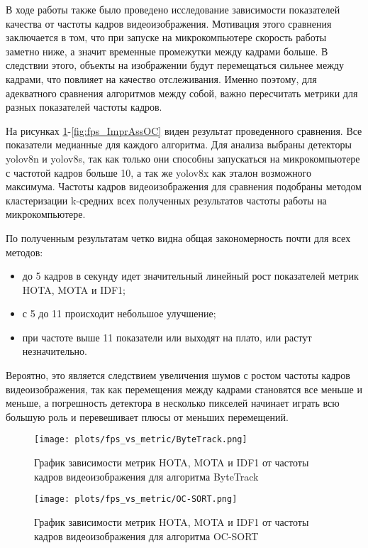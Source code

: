 В ходе работы также было проведено исследование зависимости показателей качества от частоты кадров видеоизображения. 
Мотивация этого сравнения заключается в том, что при запуске на микрокомпьютере скорость работы заметно ниже, а значит временные промежутки между кадрами больше. 
В следствии этого, объекты на изображении будут перемещаться сильнее между кадрами, что повлияет на качество отслеживания. 
Именно поэтому, для адекватного сравнения алгоритмов между собой, важно пересчитать метрики для разных показателей частоты кадров. 

На рисунках \ref{fig:fps_ByteTrack}-\ref{fig:fps_ImprAssOC} виден результат проведенного сравнения. 
Все показатели медианные для каждого алгоритма. 
Для анализа выбраны детекторы yolov8n и yolov8s, так как только они способны запускаться на микрокомпьютере с частотой кадров больше 10, а так же yolov8x как эталон возможного максимума.
Частоты кадров видеоизображения для сравнения подобраны методом кластеризации k-средних всех полученных результатов частоты работы на микрокомпьютере.

По полученным результатам четко видна общая закономерность почти для всех методов: 
\begin{itemize}
    \item до 5 кадров в секунду идет значительный линейный рост показателей метрик HOTA, MOTA и IDF1;
    \item с 5 до 11 происходит небольшое улучшение;
    \item при частоте выше 11 показатели или выходят на плато, или растут незначительно.
\end{itemize}
Вероятно, это является следствием увеличения шумов с ростом частоты кадров видеоизображения, так как перемещения между кадрами становятся все меньше и меньше, а погрешность детектора в несколько пикселей начинает играть всю большую роль и перевешивает плюсы от меньших перемещений.

\begin{figure}[ht]
    \centering
    \texttt{[image: plots/fps\_vs\_metric/ByteTrack.png]}
    \caption{График зависимости метрик HOTA, MOTA и IDF1 от частоты кадров видеоизображения для алгоритма ByteTrack}
    \label{fig:fps_ByteTrack}
\end{figure}

\begin{figure}[ht]
    \centering
    \texttt{[image: plots/fps\_vs\_metric/OC-SORT.png]}
    \caption{График зависимости метрик HOTA, MOTA и IDF1 от частоты кадров видеоизображения для алгоритма OC-SORT}
    \label{fig:fps_OC-SORT}
\end{figure}

